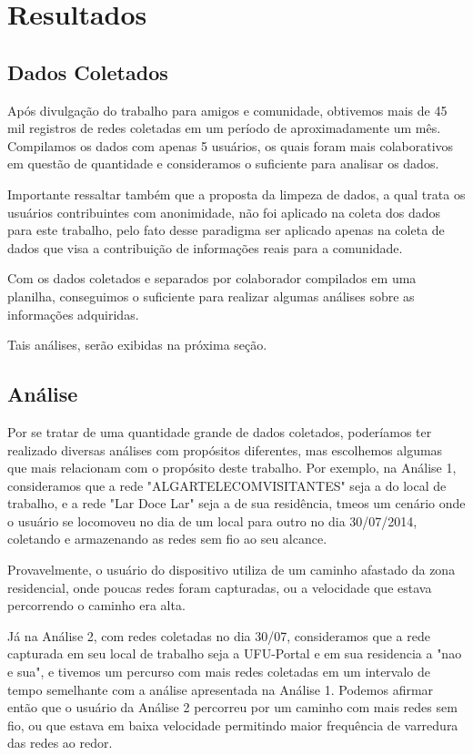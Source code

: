 \documentclass[12pt, %
openright, 
oneside,
a4paper,
brazil]{facom-ufu-abntex2}
\begin{document}
\chapter{Resultados}
\section{Dados Coletados}
Após divulgação do trabalho para amigos e comunidade, obtivemos mais de 45 mil registros de redes coletadas em um período de aproximadamente um mês. Compilamos os dados com apenas 5 usuários, os quais foram mais colaborativos em questão de quantidade e consideramos o suficiente para analisar os dados.

Importante ressaltar também que a proposta da limpeza de dados, a qual trata os usuários contribuintes com anonimidade, não foi aplicado na coleta dos dados para este trabalho, pelo fato desse paradigma ser aplicado apenas na coleta de dados que visa a contribuição de informações reais para a comunidade.

Com os dados coletados e separados por colaborador compilados em uma planilha, conseguimos o suficiente para realizar algumas análises sobre as informações adquiridas. 

 Tais análises, serão exibidas na próxima seção.

\section{Análise}
Por se tratar de uma quantidade grande de dados coletados, poderíamos ter realizado diversas análises com propósitos diferentes, mas escolhemos algumas que mais relacionam com o propósito deste trabalho. Por exemplo, na Análise 1, consideramos que a rede "ALGARTELECOMVISITANTES"  seja a do local de trabalho, e a rede "Lar Doce Lar" seja a de sua residência, tmeos um cenário onde o usuário se locomoveu no dia  de um local para outro no dia 30/07/2014, coletando e armazenando as redes sem fio ao seu alcance.


 Provavelmente, o usuário do dispositivo utiliza de um caminho afastado da zona residencial, onde poucas redes foram capturadas, ou a velocidade que estava percorrendo o caminho era alta. 
 
 Já na Análise 2, com redes coletadas no dia 30/07, consideramos que a rede capturada em seu local de trabalho seja a UFU-Portal e em sua residencia a "nao e sua", e tivemos um percurso com mais redes coletadas em um intervalo de tempo semelhante com a análise apresentada na Análise 1. Podemos afirmar então que o usuário da Análise 2 percorreu por um caminho com mais redes sem fio, ou que estava em baixa velocidade permitindo maior frequência de varredura das redes ao redor. 
\end{document}
